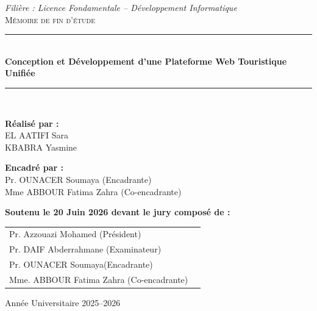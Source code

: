 \documentclass[a4paper,12pt]{report}
\begin{document}
\begin{center}
    {\normalsize \textit{Filière : Licence Fondamentale -- Développement Informatique }}\\[0.8cm]

    \textsc{\large Mémoire de fin d'étude }\\[0.8cm]
    \rule{\linewidth}{0.4pt}\\[0.4cm]
    {\Huge \textbf{Conception et Développement d'une Plateforme Web Touristique Unifiée  }}\\[0.4cm]
    \rule{\linewidth}{0.4pt}\\[1.5cm]

 \begin{minipage}{\textwidth}

        \textbf{Réalisé par :}\\
        EL AATIFI Sara\\
        KBABRA Yasmine
    \end{minipage}

    \hfill
    \begin{minipage}{0.45\textwidth}
        \raggedleft
        \textbf{Encadré par  :}\\
        Pr. OUNACER Soumaya (Encadrante)  \\ Mme ABBOUR Fatima Zahra (Co-encadrante) 
    \end{minipage}
\vspace{1.5cm}

\begin{minipage}{\textwidth}
\begin{flushleft}
\textbf{Soutenu le 20 Juin 2026 devant le jury composé de :}\\[0.2cm]
\vspace{0.5cm}
\begin{tabular}{l l}
Pr. Azzouazi Mohamed (Président)\\
Pr. DAIF Abderrahmane (Examinateur)    \\
Pr. OUNACER Soumaya(Encadrante)\\
Mme. ABBOUR Fatima Zahra  (Co-encadrante) \\
\end{tabular}
\end{flushleft}
\end{minipage}
\end{center}

\begin{center}

\vspace{2cm}

    {\large Année Universitaire 2025--2026}

    \end{center}
\end{document}
